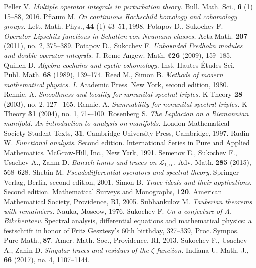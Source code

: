 \begin{thebibliography}{99}
 Peller V. {\it Multiple operator integrals in perturbation theory.} Bull. Math. Sci., {\bf 6} (1) 15--88, 2016.
 Pflaum M. {\it On continuous Hochschild homology and cohomology groups.} Lett. Math. Phys., {\bf 44} (1) 43--51, 1998.
 Potapov D., Sukochev F. {\it Operator-Lipschitz functions in Schatten-von Neumann classes.} Acta Math. {\bf 207} (2011), no. 2, 375--389.
 Potapov D., Sukochev F. {\it Unbounded Fredholm modules and double operator integrals.} J. Reine Angew. Math. {\bf 626} (2009), 159--185.
 Quillen D. {\it Algebra cochains and cyclic cohomology.} Inst. Hautes \'Etudes Sci. Publ. Math. {\bf 68} (1989), 139--174.        
 Reed M., Simon B. {\it Methods of modern mathematical physics. I.} Academic Press, New York, second edition, 1980.
 Rennie, A. {\it Smoothness and locality for nonunital spectral triples.} K-Theory {\bf 28} (2003), no. 2, 127-–165. 
 Rennie, A. {\it Summability for nonunital spectral triples. } K-Theory {\bf 31} (2004), no. 1, 71-–100.
 Rosenberg S. {\it The Laplacian on a Riemannian manifold. An introduction to analysis on manifolds.} London Mathematical Society Student Texts, {\bf 31}. Cambridge University Press, Cambridge, 1997.
 Rudin W. {\it Functional analysis.} Second edition. International Series in Pure and Applied Mathematics. McGraw-Hill, Inc., New York, 1991.
 Semenov E., Sukochev F., Usachev A., Zanin D. {\it Banach limits and traces on $\mathcal{L}_{1,\infty}.$} Adv. Math. {\bf 285} (2015), 568--628.
 Shubin M. {\it Pseudodifferential operators and spectral theory.} Springer-Verlag, Berlin, second edition, 2001.
 Simon B. {\it Trace ideals and their applications.} Second edition. Mathematical Surveys and Monographs, {\bf 120}. American Mathematical Society, Providence, RI, 2005.
 Subhankulov M. {\it Tauberian theorems with remainders.} Nauka, Moscow, 1976.
 Sukochev F. {\it On a conjecture of A. Bikchentaev.} Spectral analysis, differential equations and mathematical physics: a festschrift in honor of Fritz Gesztesy's 60th birthday, 327--339, Proc. Sympos. Pure Math., {\bf 87}, Amer. Math. Soc., Providence, RI, 2013.
 Sukochev F., Usachev A., Zanin D. {\it Singular traces and residues of the $\zeta$-function.} Indiana U. Math. J., {\bf 66} (2017), no. 4, 1107--1144.
\end{thebibliography}


